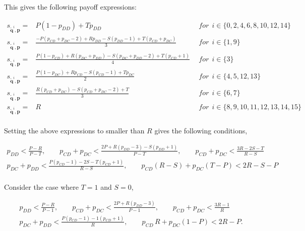 \documentclass{article}
\theoremstyle{definition}
\begin{document}
This gives the following payoff expressions:

\begin{equation*}
  \begin{array}{lcl}
  s_{\mathbf{\tilde{q}}^{i}, \mathbf{p}} = & P (1 - p_{DD}) + T p_{DD} & ~~for~~ i \in \{0, 2, 4, 6, 8, 10, 12, 14\} \\ [0.3cm]
  s_{\mathbf{\tilde{q}}^{i}, \mathbf{p}} = & \frac{-P(p_{CD} + p_{DC} - 2) + Rp_{DD} - S(p_{DD} - 1) + T(p_{CD} + p_{DC})}{3} & ~~for~~ i \in \{1, 9\} \\ [0.3cm]
  s_{\mathbf{\tilde{q}}^{i}, \mathbf{p}} = & \frac{P(1 - p_{CD}) + R(p_{DC} + p_{DD}) - S(p_{DC} + p_{DD} - 2) + T(p_{CD} + 1)}{4} & ~~for~~ i \in \{3\} \\ [0.3cm]
  s_{\mathbf{\tilde{q}}^{i}, \mathbf{p}} = & \frac{P(1 - p_{DC}) + Rp_{CD} - S(p_{CD} - 1) + Tp_{DC}}{2} & ~~for~~ i \in \{4, 5, 12, 13\} \\ [0.3cm]
  s_{\mathbf{\tilde{q}}^{i}, \mathbf{p}} = & \frac{R(p_{CD} + p_{DC}) - S(p_{CD} + p_{DC} - 2) + T}{3} & ~~for~~ i \in \{6, 7\} \\ [0.3cm]
  s_{\mathbf{\tilde{q}}^{i}, \mathbf{p}} = & R & ~~for~~ i \in \{8, 9, 10, 11, 12, 13, 14, 15\} \\ [0.3cm]
\end{array}
\end{equation*}

Setting the above expressions to smaller than $R$ gives the following conditions,

\normalsize{
\begin{equation*}
  \begin{array}{c}
  p_{DD} < \frac{P - R}{P - T}, 
  \qquad p_{CD} + p_{DC} < \frac{2 P + R (p_{DD} - 3) - S (p_{DD} + 1)}{P - T},
  \qquad p_{CD} + p_{DC} < \frac{3 R - 2 S - T}{R - S} \\ [0.4cm]
  p_{DC} + p_{DD} < \frac{P (p_{CD} - 1) - 2 S - T (p_{CD} + 1)}{R - S},
  \qquad p_{CD} \left(R - S\right) + p_{DC} \left(T - P\right) < 2 R - S - P \\
\end{array}
\end{equation*}}

Consider the case where $T=1$ and $S=0$,

\begin{equation*}
  \begin{array}{c}
  p_{DD} < \frac{P - R}{P - 1},
  \qquad p_{CD} + p_{DC} < \frac{2 P + R (p_{DD} - 3)}{P - 1},
  \qquad p_{CD} + p_{DC} < \frac{3 R - 1}{R} \\ [0.4cm]
  p_{DC} + p_{DD} < \frac{P (p_{CD} - 1) - 1 (p_{CD} + 1)}{R},
  \qquad p_{CD} \, R + p_{DC} \left(1 - P\right) < 2 R  - P.
\end{array}
\end{equation*}
\end{document}
